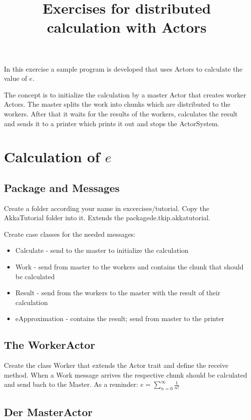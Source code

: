 \documentclass[11pt]{tudexercise}
\title{Exercises for distributed calculation with Actors}
\begin{document}
  \maketitle
  
  In this exercise a sample program is developed that uses Actors to calculate the value of $e$.

The concept is to initialize the calculation by a master Actor that creates worker Actors. The master splits the work into chunks which are distributed to the workers. After that it waits for the results of the workers, calculates the result and sends it to a printer which prints it out and stops the ActorSystem.


\section{Calculation of $e$}

\subsection{Package and Messages}

Create a folder according your name in excercises/tutorial. Copy the AkkaTutorial folder into it. Extends the packagede.tkip.akkatutorial.

Create case classes for the needed messages:
\begin{itemize}
\item Calculate - send to the master to initialize the calculation
\item Work - send from master to the workers and contains the chunk that should be calculated
\item Result - send from the workers to the master with the result of their calculation
\item eApproximation - contains the result; send from master to the printer
\end{itemize}

\subsection{The WorkerActor}

Create the class Worker that extends the Actor trait and define the receive method. When a Work message arrives the respective chunk should be calculated and send bach to the Master. As a reminder: $e = \sum_{n=0}^{\infty}{\frac{1}{n!}}$

\subsection{Der MasterActor}
\end{document}
